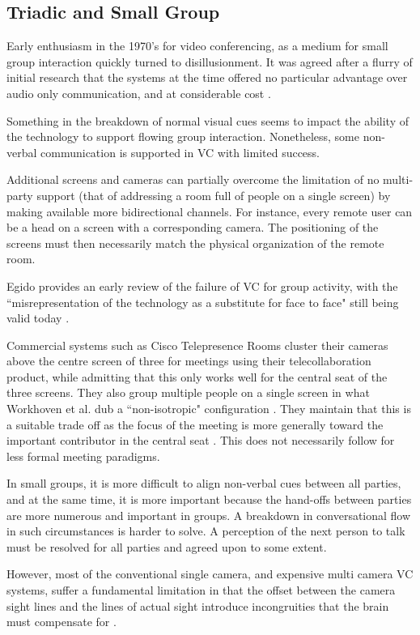         \subsection{Triadic and Small Group}
Early enthusiasm in the 1970's for video conferencing, as a medium for small group interaction quickly turned to disillusionment. It was agreed after a flurry of initial research that the systems at the time offered no particular advantage over audio only communication, and at considerable cost \cite{Williams1977}.\par
Something in the breakdown of normal visual cues seems to impact the ability of the technology to support flowing group interaction. Nonetheless, some non-verbal communication is supported in VC with limited success. \par
Additional screens and cameras can partially overcome the limitation of no multi-party support (that of addressing a room full of people on a single screen) by making available more bidirectional channels. For instance, every remote user can be a head on a screen with a corresponding camera. The positioning of the screens must then necessarily match the physical organization of the remote room.\par
Egido provides an early review of the failure of VC for group activity, with the ``misrepresentation of the technology as a substitute for face to face" still being valid today \cite{Edigo1988}.\par
Commercial systems such as Cisco Telepresence Rooms cluster their cameras above the centre screen of three for meetings using their telecollaboration product, while admitting that this only works well for the central seat of the three screens. They also group multiple people on a single screen in what Workhoven et al. dub a ``non-isotropic" configuration \cite{Pejsa2016}. They maintain that this is a suitable trade off as the focus of the meeting is more generally toward the important contributor in the central seat \cite{CiscoSystems}. This does not necessarily follow for less formal meeting paradigms.\par
            In small groups, it is more difficult to align non-verbal cues between all  parties, and at the same time, it is more important because the hand-offs between parties are more numerous and important in groups. A breakdown in conversational flow in such circumstances is harder to solve. A perception of the next person to talk must be resolved for all parties and agreed upon to some extent.\par
                However, most of the conventional single camera, and expensive multi camera VC systems, suffer a fundamental limitation in that the offset between the camera sight lines and the lines of actual sight introduce incongruities that the brain must compensate for \cite{Wolff2008}.\par
